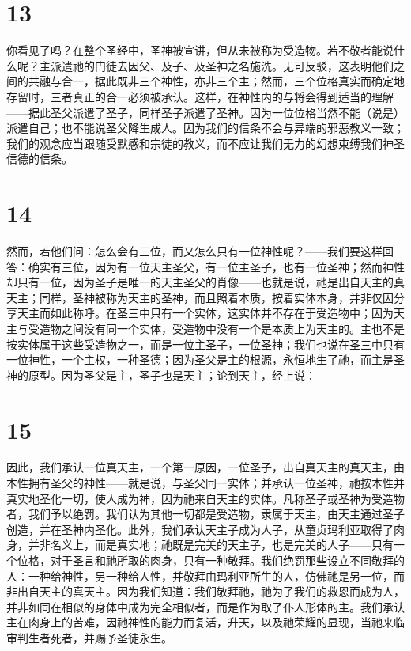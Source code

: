 
\section{13}

你看见了吗？在整个圣经中，圣神被宣讲，但从未被称为受造物。若不敬者能说什么呢？主派遣祂的门徒去因父、及子、及圣神之名施洗。无可反驳，这表明他们之间的共融与合一，据此既非三个神性，亦非三个主；然而，三个位格真实而确定地存留时，三者真正的合一必须被承认。这样，在神性内的与将会得到适当的理解——据此圣父派遣了圣子，同样圣子派遣了圣神。因为一位位格当然不能（说是）派遣自己；也不能说圣父降生成人。因为我们的信条不会与异端的邪恶教义一致；我们的观念应当跟随受默感和宗徒的教义，而不应让我们无力的幻想束缚我们神圣信德的信条。\par


\section{14}

然而，若他们问：怎么会有三位，而又怎么只有一位神性呢？——我们要这样回答：确实有三位，因为有一位天主圣父，有一位主圣子，也有一位圣神；然而神性却只有一位，因为圣子是唯一的天主圣父的肖像——也就是说，祂是出自天主的真天主；同样，圣神被称为天主的圣神，而且照着本质，按着实体本身，并非仅因分享天主而如此称呼。在圣三中只有一个实体，这实体并不存在于受造物中；因为天主与受造物之间没有同一个实体，受造物中没有一个是本质上为天主的。主也不是按实体属于这些受造物之一，而是一位主圣子，一位圣神；我们也说在圣三中只有一位神性，一个主权，一种圣德；因为圣父是主的根源，永恒地生了祂，而主是圣神的原型。因为圣父是主，圣子也是天主；论到天主，经上说：\par


\section{15}

因此，我们承认一位真天主，一个第一原因，一位圣子，出自真天主的真天主，由本性拥有圣父的神性——就是说，与圣父同一实体；并承认一位圣神，祂按本性并真实地圣化一切，使人成为神，因为祂来自天主的实体。凡称圣子或圣神为受造物者，我们予以绝罚。我们认为其他一切都是受造物，隶属于天主，由天主通过圣子创造，并在圣神内圣化。此外，我们承认天主子成为人子，从童贞玛利亚取得了肉身，并非名义上，而是真实地；祂既是完美的天主子，也是完美的人子——只有一个位格，对于圣言和祂所取的肉身，只有一种敬拜。我们绝罚那些设立不同敬拜的人：一种给神性，另一种给人性，并敬拜由玛利亚所生的人，仿佛祂是另一位，而非出自天主的真天主。因为我们知道：我们敬拜祂，祂为了我们的救恩而成为人，并非如同在相似的身体中成为完全相似者，而是作为取了仆人形体的主。我们承认主在肉身上的苦难，因祂神性的能力而复活，升天，以及祂荣耀的显现，当祂来临审判生者死者，并赐予圣徒永生。\par

